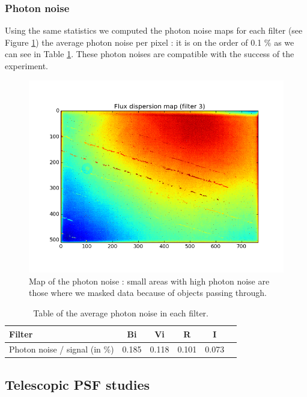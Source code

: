 \documentclass[\docopts]{\docclass}
\begin{document}
\subsubsection{Photon noise}
\label{subsec:photon_noise}
Using the same statistics we computed the photon noise maps for each
filter (see Figure \ref{fig:photon_noise}) the average photon noise
per pixel : it is on the order of 0.1 \% as we can see in Table
\ref{tab:photon_noise}. These photon noises are compatible with the
success of the experiment.
\begin{figure}[ht]
  \centering
  \includegraphics[width=0.90\linewidth]{master_flat_3_var.png}
  \caption{Map of the photon noise : small areas with high photon
    noise are those where we masked data because of objects passing
    through.}
  \label{fig:photon_noise}
\end{figure}

\begin{table}
  \centering
  \caption{Table of the average photon noise in each filter.}
  \begin{tabular}{lccccc}
    \hline
    \hline
    Filter & Bi & Vi & R & I \\
    \hline
    Photon noise / signal (in \%) & 0.185 & 0.118  & 0.101 & 0.073 \\
    \hline
  \end{tabular}

  \label{tab:photon_noise}
\end{table} 

\subsection{Telescopic PSF studies}
\end{document}
